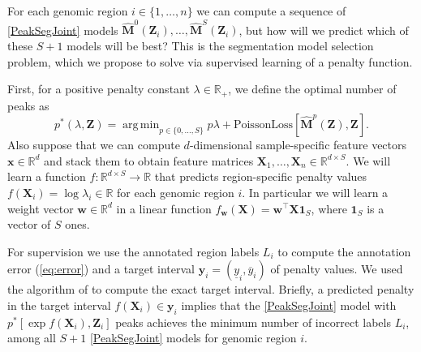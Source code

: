 \documentclass{article} %
\DeclareMathOperator*{\argmin}{arg\,min}
\newcommand{\RR}{\mathbb R}
\begin{document}
For each genomic region $i\in\{1,\dots,n\}$ we can compute a sequence
of \ref{PeakSegJoint} models $\mathbf{\hat M}^0(\mathbf Z_i),\dots,
\mathbf{\hat M}^S(\mathbf Z_i)$, but how will we predict which of
these $S+1$ models will be best?
This is the segmentation model selection problem, which we propose to
solve via supervised learning of a penalty function.

First, for a positive penalty constant $\lambda\in\RR_+$, we define
the optimal number of peaks as
\begin{equation}
  \label{eq:optimal_segments}
  p^*(\lambda, \mathbf Z) =
  \argmin_{p\in\{0, \dots, S\}}
  p \lambda + 
  \text{PoissonLoss}\left[
    \mathbf{\hat M}^p(\mathbf Z),
    \mathbf Z
  \right].
\end{equation}
Also suppose that we can compute $d$-dimensional sample-specific
feature vectors $\mathbf x\in\RR^d$ and stack them to obtain feature
matrices $\mathbf X_1,\dots, \mathbf X_n\in\RR^{d\times S}$. We will
learn a function $f:\RR^{d\times S}\rightarrow\RR$ that predicts
region-specific penalty values $f(\mathbf X_i) = \log \lambda_i\in\RR$
for each genomic region $i$. In particular we will learn a weight
vector $\mathbf w\in\RR^d$ in a linear function $f_{\mathbf w}(\mathbf X) =
\mathbf w^\intercal \mathbf X \mathbf 1_S$, where $\mathbf 1_S$ is a
vector of $S$ ones.

For supervision we use the annotated region labels $L_i$ to compute
the annotation error (\ref{eq:error}) and a target interval $\mathbf
y_i = (
    \underline y_i, \overline y_i
)$ of penalty values. We used the algorithm of
\citet{HOCKING-penalties} to compute the exact target interval.
Briefly,
a predicted penalty in the target interval $f(\mathbf
X_i)\in\mathbf y_i$ implies that the
\ref{PeakSegJoint} model with $p^*\left[\exp f(\mathbf X_i), \mathbf
  Z_i\right]$ peaks achieves the minimum number of incorrect labels
$L_i$, among all $S+1$ \ref{PeakSegJoint} models for genomic region $i$.
\end{document}
